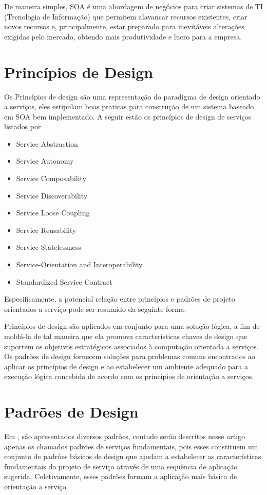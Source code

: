 \documentclass[12pt]{article}
\begin{document}
De maneira simples, SOA é uma abordagem de negócios para criar sistemas de TI (Tecnologia de Informação) que permitem alavancar recursos existentes, criar novos recursos e, principalmente, estar preparado para inevitáveis alterações exigidas pelo mercado, obtendo mais produtividade e lucro para a empresa.


\section{Princípios de Design} 

Os Princípios de design são uma representação do paradigma de design orientado a serviços, eles estipulam boas praticas para construção de um sistema baseado em SOA bem implementado. A seguir estão os princípios de design de serviços listados por %

\begin{itemize}
\item Service Abstraction
\item Service Autonomy
\item Service Composability 
\item Service Discoverability
\item Service Loose Coupling
\item Service Reusability
\item Service Statelessness
\item Service-Orientation and Interoperability
\item Standardized Service Contract
\end{itemize}

Especificamente, a potencial relação entre princípios e padrões de projeto orientados a serviço pode ser resumido da seguinte forma:

Princípios de design são aplicados em conjunto para uma solução lógica, a fim de moldá-la de tal maneira que ela promova características chaves de design que suportem os objetivos estratégicos associados à computação orientada a serviços.
Os padrões de design fornecem soluções para problemas comuns encontrados ao aplicar os princípios de design e ao estabelecer um ambiente adequado para a execução lógica concebida de acordo com os princípios de orientação a serviços.

\section{Padrões de Design}

Em \cite{erl_padroes}, são apresentados diversos padrões, contudo serão descritos nesse artigo apenas os chamados padrões de serviços fundamentais, pois esses constituem um conjunto de padrões básicos de design que ajudam a estabelecer as características fundamentais do projeto de serviço através de uma sequência de aplicação sugerida. Coletivamente, esses padrões formam a aplicação mais básica de orientação a serviço.
\end{document}
